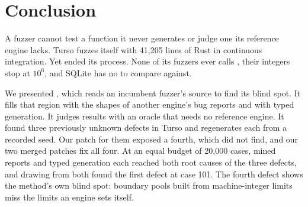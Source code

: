 \section{Conclusion}
\label{sec:conclusion}

A fuzzer cannot test a function it never generates or judge one its reference
engine lacks. Turso fuzzes itself with 41{,}205 lines of Rust in continuous
integration. Yet  ended its
process. None of its fuzzers ever calls , their integers stop at
$10^6$, and SQLite has no  to compare against.

We presented \tool, which reads an incumbent fuzzer's source to find its blind
spot. It fills that region with the shapes of another engine's bug reports and
with typed generation. It judges results with an oracle that needs no reference
engine. It found three previously unknown defects in Turso and regenerates each
from a recorded seed. Our patch for them exposed a fourth, which \tool did not
find, and our two merged patches fix all four. At an equal budget of 20{,}000
cases, mined reports and typed generation each reached both root causes of the
three defects, and drawing from both found the first defect at case 101. The
fourth defect shows the method's own blind spot: boundary pools built from
machine-integer limits miss the limits an engine sets itself.
